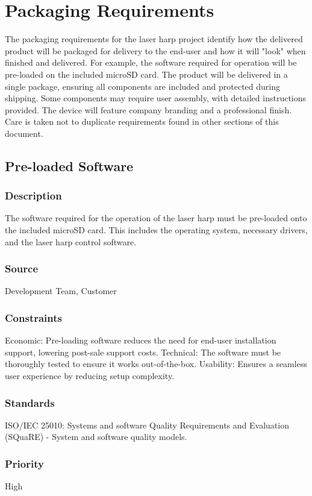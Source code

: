 \section{Packaging Requirements}

The packaging requirements for the laser harp project identify how the delivered product will be packaged for delivery to the end-user and how it will "look" when finished and delivered. For example, the software required for operation will be pre-loaded on the included microSD card. The product will be delivered in a single package, ensuring all components are included and protected during shipping. Some components may require user assembly, with detailed instructions provided. The device will feature company branding and a professional finish. Care is taken not to duplicate requirements found in other sections of this document.


\subsection{Pre-loaded Software}
\subsubsection{Description}
The software required for the operation of the laser harp must be pre-loaded onto the included microSD card. This includes the operating system, necessary drivers, and the laser harp control software.
\subsubsection{Source}
Development Team, Customer
\subsubsection{Constraints}
Economic: Pre-loading software reduces the need for end-user installation support, lowering post-sale support costs.
Technical: The software must be thoroughly tested to ensure it works out-of-the-box.
Usability: Ensures a seamless user experience by reducing setup complexity.
\subsubsection{Standards}
ISO/IEC 25010: Systems and software Quality Requirements and Evaluation (SQuaRE) - System and software quality models.
\subsubsection{Priority}
High


